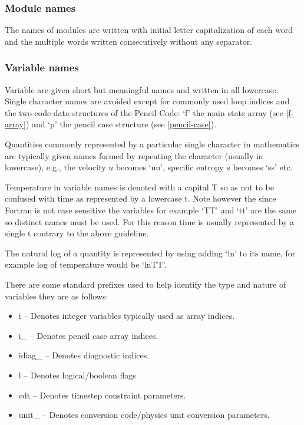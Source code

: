 \documentclass[\mydriver,12pt,twoside,notitlepage,a4paper]{article}
\begin{document}
\subsubsection{Module names}
The names of modules are written with initial letter capitalization
of each word and the multiple words written consecutively without
any separator.

\subsubsection{Variable names}
Variable are given short but meaningful names and written
in all lowercase.  Single character names are avoided except
for commonly used loop indices and the two code data structures
of the {\sc Pencil Code}: `f' the main state array (see \ref{f-array}) and `p' the pencil case
structure (see \ref{pencil-case}).

Quantities commonly represented by a particular single character
in mathematics are typically given names formed by repeating the
character (usually in lowercase), e.g., the velocity $u$ becomes `uu',
specific entropy $s$ becomes `ss' etc.

Temperature in variable names is denoted with a capital T so as not to
be confused with time as represented by a lowercase t.  Note however the
since Fortran is not case sensitive the variables for example `TT' and
`tt' are the same so distinct names must be used. For this reason time is
usually represented by a single t contrary to the above guideline.

The natural log of a quantity is represented by using adding `ln' to its
name, for example log of temperature would be `lnTT'.

There are some standard prefixes used to help identify the type and nature
of variables they are as follows:
\begin{itemize}
\item i -- Denotes integer variables typically used as array indices.
\item i_ -- Denotes pencil case array indices.
\item idiag_ -- Denotes diagnostic indices.
\item l -- Denotes logical/boolean flags
\item cdt -- Denotes timestep constraint parameters.
\item unit_ -- Denotes conversion code/physics unit conversion parameters.
\end{itemize}
\end{document}
